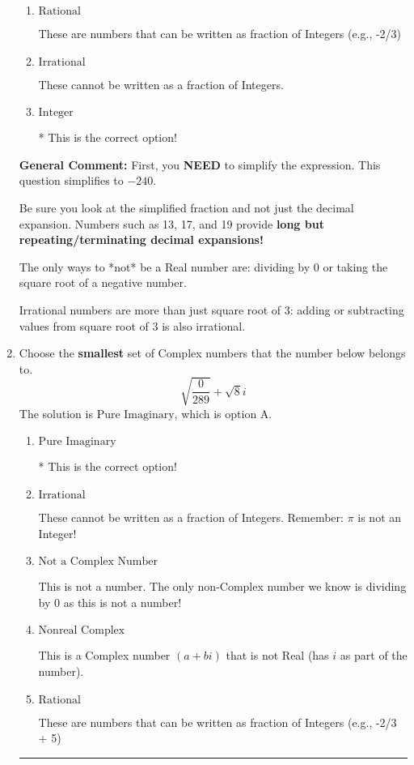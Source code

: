 \documentclass{extbook}[14pt]
\newcommand{\litem}[1]{\item #1

\rule{\textwidth}{0.4pt}}
\begin{document}
\begin{enumerate}
{\begin{enumerate}[label=\Alph*.]
These are the counting numbers with 0 (0, 1, 2, 3, ...)
\item \( \text{Rational} \)

These are numbers that can be written as fraction of Integers (e.g., -2/3)
\item \( \text{Irrational} \)

These cannot be written as a fraction of Integers.
\item \( \text{Integer} \)

* This is the correct option!
\end{enumerate}

\textbf{General Comment:} First, you \textbf{NEED} to simplify the expression. This question simplifies to $-240$. 
 
 Be sure you look at the simplified fraction and not just the decimal expansion. Numbers such as 13, 17, and 19 provide \textbf{long but repeating/terminating decimal expansions!} 
 
 The only ways to *not* be a Real number are: dividing by 0 or taking the square root of a negative number. 
 
 Irrational numbers are more than just square root of 3: adding or subtracting values from square root of 3 is also irrational.
}
\litem{
Choose the \textbf{smallest} set of Complex numbers that the number below belongs to.
\[ \sqrt{\frac{0}{289}}+\sqrt{8}i \]The solution is \( \text{Pure Imaginary} \), which is option A.\begin{enumerate}[label=\Alph*.]
\item \( \text{Pure Imaginary} \)

* This is the correct option!
\item \( \text{Irrational} \)

These cannot be written as a fraction of Integers. Remember: $\pi$ is not an Integer!
\item \( \text{Not a Complex Number} \)

This is not a number. The only non-Complex number we know is dividing by 0 as this is not a number!
\item \( \text{Nonreal Complex} \)

This is a Complex number $(a+bi)$ that is not Real (has $i$ as part of the number).
\item \( \text{Rational} \)

These are numbers that can be written as fraction of Integers (e.g., -2/3 + 5)
\end{enumerate}

}
\end{enumerate}
\end{document}
